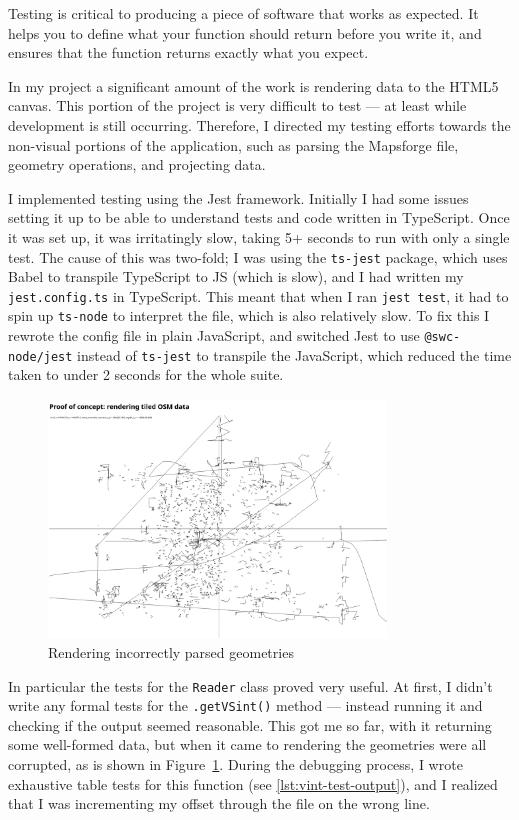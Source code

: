 \documentclass[hyphens]{final_report}
\begin{document}
Testing is critical to producing a piece of software that works as expected. It helps you to define what your function should return before you write it, and ensures that the function returns exactly what you expect.

In my project a significant amount of the work is rendering data to the HTML5 canvas. This portion of the project is very difficult to test --- at least while development is still occurring. Therefore, I directed my testing efforts towards the non-visual portions of the application, such as parsing the Mapsforge file, geometry operations, and projecting data.

I implemented testing using the Jest framework. Initially I had some issues setting it up to be able to understand tests and code written in TypeScript. Once it was set up, it was irritatingly slow, taking 5+ seconds to run with only a single test. The cause of this was two-fold; I was using the \texttt{ts-jest} package, which uses Babel to transpile TypeScript to JS (which is slow), and I had written my \texttt{jest.config.ts} in TypeScript. This meant that when I ran \texttt{jest test}, it had to spin up \texttt{ts-node} to interpret the file, which is also relatively slow. To fix this I rewrote the config file in plain JavaScript, and switched Jest to use \texttt{@swc-node/jest} instead of \texttt{ts-jest} to transpile the JavaScript, which reduced the time taken to under 2 seconds for the whole suite.

\begin{figure}[ht]
    \centering
    \includegraphics[width=0.8\textwidth]{../proof-of-concepts/4-rendering-osm-data/screenshots/artifacts.png}
    \caption{Rendering incorrectly parsed geometries}\label{fig:artifacts}
\end{figure}

In particular the tests for the \texttt{Reader} class proved very useful. At first, I didn't write any formal tests for the \texttt{.getVSint()} method --- instead running it and checking if the output seemed reasonable. This got me so far, with it returning some well-formed data, but when it came to rendering the geometries were all corrupted, as is shown in Figure~\ref{fig:artifacts}. During the debugging process, I wrote exhaustive table tests for this function (see \autoref{lst:vint-test-output}), and I realized that I was incrementing my offset through the file on the wrong line.
\end{document}
